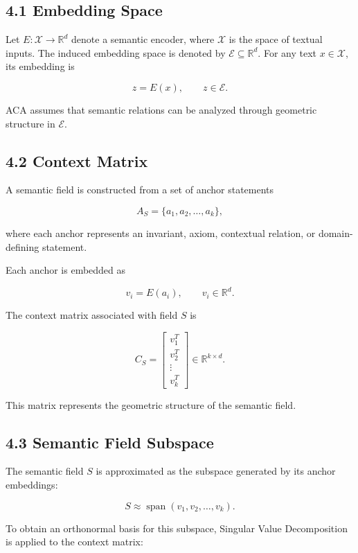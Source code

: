 \documentclass[11pt]{article}
\begin{document}
\subsection{4.1 Embedding Space}

Let $E:\mathcal{X}\rightarrow\mathbb{R}^{d}$ denote a semantic encoder, where $\mathcal{X}$ is the space of textual inputs. The induced embedding space is denoted by $\mathcal{E}\subseteq\mathbb{R}^{d}$. For any text $x\in\mathcal{X}$, its embedding is

$$
z=E(x),
\qquad
z\in\mathcal{E}.
$$

ACA assumes that semantic relations can be analyzed through geometric structure in $\mathcal{E}$.

\subsection{4.2 Context Matrix}

A semantic field is constructed from a set of anchor statements

$$
A_S=\{a_1,a_2,\dots,a_k\},
$$

where each anchor represents an invariant, axiom, contextual relation, or domain-defining statement.

Each anchor is embedded as

$$
v_i=E(a_i),
\qquad
v_i\in\mathbb{R}^{d}.
$$

The context matrix associated with field $S$ is

$$
C_S
=
\begin{bmatrix}
v_1^{T}\\
v_2^{T}\\
\vdots\\
v_k^{T}
\end{bmatrix}
\in\mathbb{R}^{k\times d}.
$$

This matrix represents the geometric structure of the semantic field.

\subsection{4.3 Semantic Field Subspace}

The semantic field $S$ is approximated as the subspace generated by its anchor embeddings:

$$
S
\approx
\operatorname{span}(v_1,v_2,\dots,v_k).
$$

To obtain an orthonormal basis for this subspace, Singular Value Decomposition is applied to the context matrix:
\end{document}
